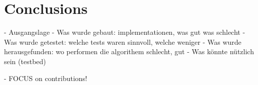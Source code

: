 \chapter{Conclusions}
\label{c:conclusions} 
- Ausgangslage
- Was wurde gebaut: implementationen, was gut was schlecht
- Was wurde getestet: welche tests waren sinnvoll, welche weniger
- Was wurde herausgefunden: wo performen die algorithem schlecht, gut
- Was könnte nützlich sein (testbed)


- FOCUS on contributions!
